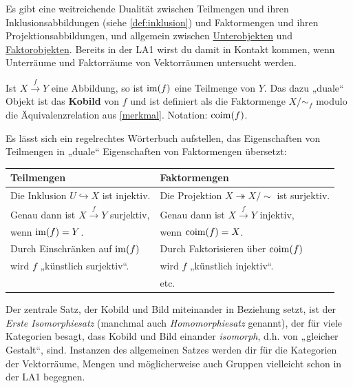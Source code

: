 \begin{vorschau} \label{teilmengenvsfaktormengen} 
    Es gibt eine weitreichende Dualität zwischen Teilmengen und ihren Inklusionsabbildungen (siehe \cref{def:inklusion}) und Faktormengen und ihren Projektionsabbildungen, und allgemein zwischen \href{https://ncatlab.org/nlab/show/subobject}{Unterobjekten} und \href{https://ncatlab.org/nlab/show/quotient+object}{Faktorobjekten}. Bereits in der LA1 wirst du damit in Kontakt kommen, wenn Unterräume und Faktorräume von Vektorräumen untersucht werden.
    
    Ist $X\xrightarrow{f} Y$ eine Abbildung, so ist $\operatorname{im}(f)$ eine Teilmenge von $Y$. Das dazu „duale“ Objekt ist das \textbf{Kobild} von $f$ und ist definiert als die Faktormenge $X/{\sim_f}$ modulo die Äquivalenzrelation aus \cref{merkmal}. Notation: $\operatorname{coim}(f)$.
    
    Es lässt sich ein regelrechtes Wörterbuch aufstellen, das Eigenschaften von Teilmengen in „duale“ Eigenschaften von Faktormengen übersetzt:
    \begin{center}
    \begin{tabular}{ll}
        Teilmengen & Faktormengen \\
        \midrule
        Die Inklusion $U\hookrightarrow X$ ist injektiv. & Die Projektion $X\twoheadrightarrow X/{\sim}$ ist surjektiv. \\
        Genau dann ist $X\xrightarrow{f} Y$ surjektiv,  & Genau dann ist $X\xrightarrow{f} Y$ injektiv, \\
        \quad wenn $\operatorname{im}(f)=Y$. & \quad wenn $\operatorname{coim}(f)=X$. \\
        Durch Einschränken auf $\operatorname{im}(f)$ & Durch Faktorisieren über $\operatorname{coim}(f)$ \\
        \quad wird $f$ „künstlich surjektiv“.\footnotemark & \quad wird $f$ „künstlich injektiv“. \\
        & \hfill etc.
    \end{tabular}
    \end{center}
    Der zentrale Satz, der Kobild und Bild miteinander in Beziehung setzt, ist der \emph{Erste Isomorphiesatz} (manchmal auch \emph{Homomorphiesatz} genannt), der für viele Kategorien besagt, dass Kobild und Bild einander \emph{isomorph}, d.h. von „gleicher Gestalt“, sind. Instanzen des allgemeinen Satzes werden dir für die Kategorien der Vektorräume, Mengen und möglicherweise auch Gruppen vielleicht schon in der LA1 begegnen.
\end{vorschau}


